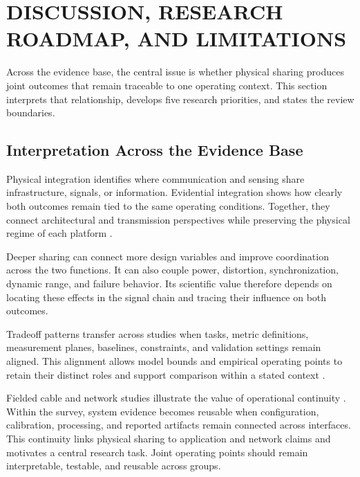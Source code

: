 \section{DISCUSSION, RESEARCH ROADMAP, AND LIMITATIONS}
\label{sec:discussion_roadmap}

Across the evidence base, the central issue is whether physical sharing
produces joint outcomes that remain traceable to one operating context. This
section interprets that relationship, develops five research priorities, and
states the review boundaries.

\subsection{Interpretation Across the Evidence Base}

Physical integration identifies where communication and sensing share
infrastructure, signals, or information. Evidential integration shows how
clearly both outcomes remain tied to the same operating conditions. Together,
they connect architectural and transmission perspectives while preserving the
physical regime of each platform
\cite{Wen2024OISACArchitectures,Su2025OISACTheoryPractice,
Liang2024LiSACReview,Liu2026OpticalFiberISACReview}.

Deeper sharing can connect more design variables and improve coordination
across the two functions. It can also couple power, distortion,
synchronization, dynamic range, and failure behavior. Its scientific value
therefore depends on locating these effects in the signal chain and tracing
their influence on both outcomes.

Tradeoff patterns transfer across studies when tasks, metric definitions,
measurement planes, baselines, constraints, and validation settings remain
aligned. This alignment allows model bounds and empirical operating points to
retain their distinct roles and support comparison within a stated context
\cite{Khorasgani2026GeneralOpticalISACSurvey,Rode2025PolarizationISAC}.

Fielded cable and network studies illustrate the value of operational
continuity
\cite{Cao2026SubmarineFiberISAC,Ip2026DeployedTelecomCableISAC}. Within the
survey, system evidence becomes reusable when configuration, calibration,
processing, and reported artifacts remain connected across interfaces. This
continuity links physical sharing to application and network claims and
motivates a central research task. Joint operating points should remain
interpretable, testable, and reusable across groups.


